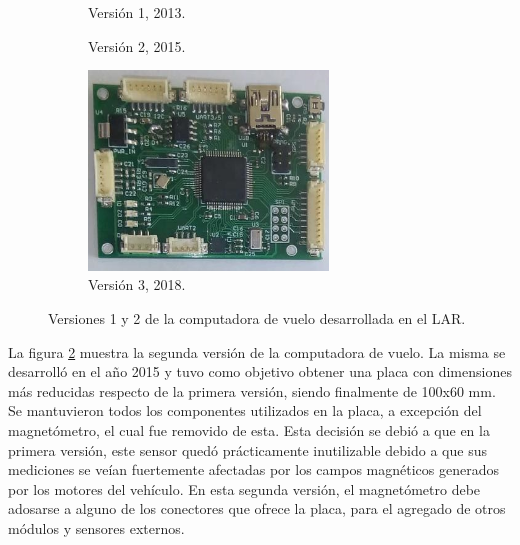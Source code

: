 %     

\begin{figure}[htb]
    \centering
    \begin{subfigure}[b]{0.48\textwidth}
        \centering
        
        \caption{Versión 1, 2013.}
        \label{fig:Choriboard_1}
    \end{subfigure}
    \begin{subfigure}[b]{0.48\textwidth}
        \centering
        
        \caption{Versión 2, 2015.}
        \label{fig:Choriboard_2}
    \end{subfigure}
    \begin{subfigure}[b]{0.48\textwidth}
        \centering
        \includegraphics[width=0.7\textwidth]{img/Choriboard_3.jpg}
        \caption{Versión 3, 2018.}
        \label{fig:Choriboard_3}
    \end{subfigure}
       \caption{Versiones 1 y 2 de la computadora de vuelo desarrollada en el LAR.  }
       \label{fig:choriboards_1_2_3}
\end{figure}

La figura \ref{fig:Choriboard_2} muestra la segunda versión de la computadora de vuelo. La misma se desarrolló en el año 2015 y tuvo como objetivo obtener una placa con dimensiones más reducidas respecto de la primera versión, siendo finalmente de 100x60 mm. Se mantuvieron todos los componentes utilizados en la placa, a excepción del magnetómetro, el cual fue removido de esta. Esta decisión se debió a que en la primera versión, este sensor quedó prácticamente inutilizable debido a que sus mediciones se veían fuertemente afectadas por los campos magnéticos generados por los motores del vehículo. En esta segunda versión, el magnetómetro debe adosarse a alguno de los conectores que ofrece la placa, para el agregado de otros módulos y sensores externos.

